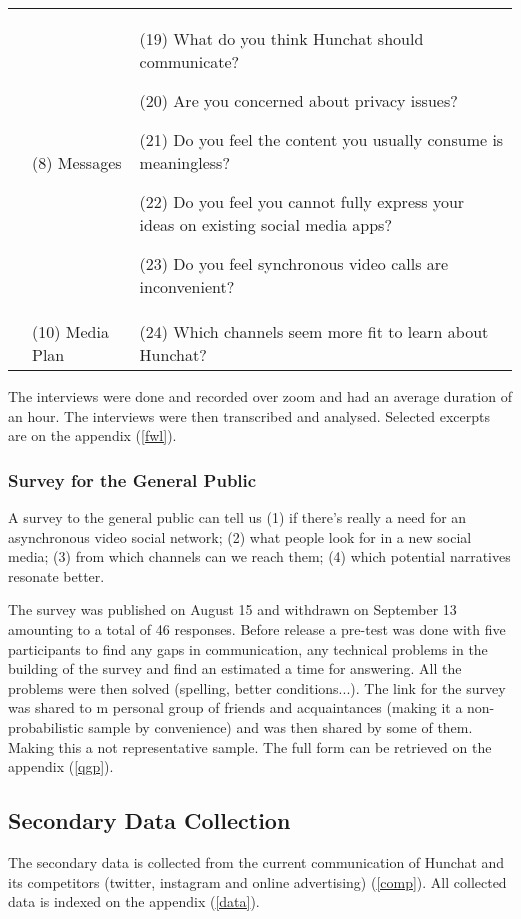 \documentclass[12pt]{article}
\begin{document}
\begin{table}[htbp]
\begin{tabular}{ @{}P{0.15\textwidth}P{0.2\textwidth}P{0.6\textwidth}@{} }
	& (8) Messages &  (19) What do you think Hunchat should communicate? \par (20) Are you concerned about privacy issues? \par (21) Do you feel the content you usually consume is meaningless? \par (22) Do you feel you cannot fully express your ideas on existing social media apps? \par (23) Do you feel synchronous video calls are inconvenient?  \\
                                   & (10) Media Plan        & (24) Which channels seem more fit to learn about Hunchat?                                                                                                                                                                                                                                                                                                       \\ \hline
\end{tabular}
\end{table}

The interviews were done and recorded over zoom and had an average duration of an hour. The interviews were then transcribed and analysed. Selected excerpts are on the appendix (\ref{fwl}).


\subsubsection{Survey for the General Public}
A survey to the general public can tell us (1) if there's really a need for an asynchronous video social network; (2) what people look for in a new social media; (3) from which channels can we reach them; (4) which potential narratives resonate better. 

The survey was published on August 15 and withdrawn on September 13 amounting to a total of 46 responses. Before release a pre-test was done with five participants to find any gaps in communication, any technical problems in the building of the survey and find an estimated a time for answering. All the problems were then solved (spelling, better conditions...). The link for the survey was shared to m personal group of friends and acquaintances (making it a non-probabilistic sample by convenience) and was then shared by some of them. Making this a not representative sample. The full form can be retrieved on the appendix (\ref{qgp}).


\subsection{Secondary Data Collection}
The secondary data is collected from the current communication of Hunchat and its competitors (twitter, instagram and online advertising) (\ref{comp}). All collected data is indexed on the appendix (\ref{data}).
\end{document}
